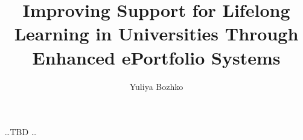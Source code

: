 \documentclass[11pt,PhD,twoside,openright]{muthesis}
\begin{document}



\title{Improving Support for Lifelong Learning in Universities Through Enhanced
ePortfolio Systems}
\author{Yuliya Bozhko}

\beforeabstract



\newpage
\cleardoublepage
 
\ldots TBD \ldots

\newpage
\cleardoublepage

 

\newpage
\cleardoublepage

 

\newpage
\cleardoublepage
 
\begin{spacing}{0.9}
\tableofcontents
\listoffigures
\listoftables
\end{spacing}

\newpage
\cleardoublepage

\afterpreface

\pagestyle{fancy}

\fancyhead{}
\fancyhead[LE,LO]{\slshape \leftmark}

\fancyfoot{} 
\fancyfoot[LE,RO]{\thepage} 
\renewcommand{\headrulewidth}{0.4pt}
\renewcommand{\footrulewidth}{0pt}


 


 
 
 
 
 

\cleardoublepage
{} 
{}
             

\appendix







\end{document}
